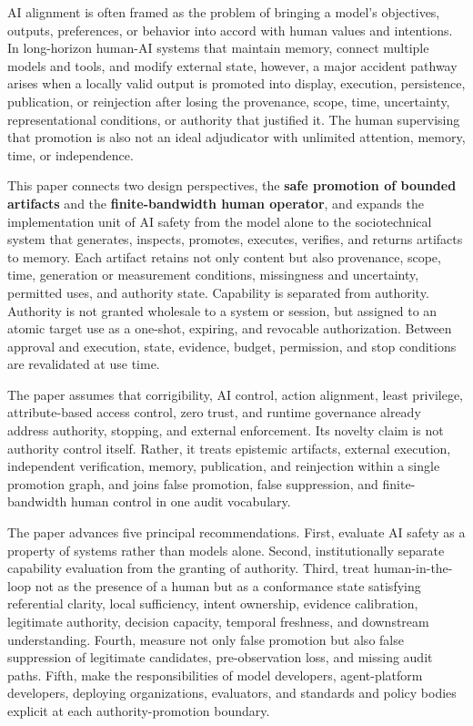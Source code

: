 AI alignment is often framed as the problem of bringing a model's objectives, outputs, preferences, or behavior into accord with human values and intentions. In long-horizon human-AI systems that maintain memory, connect multiple models and tools, and modify external state, however, a major accident pathway arises when a locally valid output is promoted into display, execution, persistence, publication, or reinjection after losing the provenance, scope, time, uncertainty, representational conditions, or authority that justified it. The human supervising that promotion is also not an ideal adjudicator with unlimited attention, memory, time, or independence.

This paper connects two design perspectives, the \textbf{safe promotion of bounded artifacts} and the \textbf{finite-bandwidth human operator}, and expands the implementation unit of AI safety from the model alone to the sociotechnical system that generates, inspects, promotes, executes, verifies, and returns artifacts to memory. Each artifact retains not only content but also provenance, scope, time, generation or measurement conditions, missingness and uncertainty, permitted uses, and authority state. Capability is separated from authority. Authority is not granted wholesale to a system or session, but assigned to an atomic target use as a one-shot, expiring, and revocable authorization. Between approval and execution, state, evidence, budget, permission, and stop conditions are revalidated at use time.

The paper assumes that corrigibility, AI control, action alignment, least privilege, attribute-based access control, zero trust, and runtime governance already address authority, stopping, and external enforcement. Its novelty claim is not authority control itself. Rather, it treats epistemic artifacts, external execution, independent verification, memory, publication, and reinjection within a single promotion graph, and joins false promotion, false suppression, and finite-bandwidth human control in one audit vocabulary.

The paper advances five principal recommendations. First, evaluate AI safety as a property of systems rather than models alone. Second, institutionally separate capability evaluation from the granting of authority. Third, treat human-in-the-loop not as the presence of a human but as a conformance state satisfying referential clarity, local sufficiency, intent ownership, evidence calibration, legitimate authority, decision capacity, temporal freshness, and downstream understanding. Fourth, measure not only false promotion but also false suppression of legitimate candidates, pre-observation loss, and missing audit paths. Fifth, make the responsibilities of model developers, agent-platform developers, deploying organizations, evaluators, and standards and policy bodies explicit at each authority-promotion boundary.

